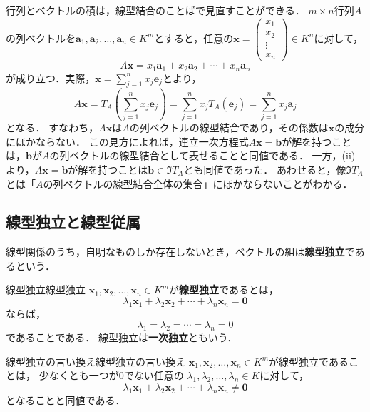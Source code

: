\begin{remark}[$A\bm{x}$は列ベクトルの線型結合]
  行列とベクトルの積は，線型結合のことばで見直すことができる．
  $m \times n$行列$A$の列ベクトルを$\bm{a}_1, \bm{a}_2, \dots, \bm{a}_n \in K^m$とすると，任意の$\bm{x} = \begin{pmatrix} x_1 \\ x_2 \\ \vdots \\ x_n \end{pmatrix} \in K^n$に対して，
  \[
    A\bm{x} = x_1 \bm{a}_1 + x_2 \bm{a}_2 + \cdots + x_n \bm{a}_n
  \]
  が成り立つ．実際，$\bm{x} = \sum_{j=1}^{n} x_j \bm{e}_j$とより，
  \[
    A\bm{x} = T_A\left(\sum_{j=1}^{n} x_j \bm{e}_j\right)
    = \sum_{j=1}^{n} x_j T_A(\bm{e}_j)
    = \sum_{j=1}^{n} x_j \bm{a}_j
  \]
  となる．
  すなわち，$A\bm{x}$は$A$の列ベクトルの線型結合であり，その係数は$\bm{x}$の成分にほかならない．
  この見方によれば，連立一次方程式$A\bm{x} = \bm{b}$が解を持つことは，$\bm{b}$が$A$の列ベクトルの線型結合として表せることと同値である．
  一方，(ii)より，$A\bm{x} = \bm{b}$が解を持つことは$\bm{b} \in \Im T_A$とも同値であった．
  あわせると，像$\Im T_A$とは「$A$の列ベクトルの線型結合全体の集合」にほかならないことがわかる．
\end{remark}

\subsection{線型独立と線型従属}

線型関係のうち，自明なものしか存在しないとき，ベクトルの組は\textbf{線型独立}であるという．

\begin{definition}{線型独立}{線型独立}
  $\bm{x}_1, \bm{x}_2, \dots, \bm{x}_n \in K^m$が\textbf{線型独立}であるとは，
  \[
    \lambda_1 \bm{x}_1 + \lambda_2 \bm{x}_2 + \cdots + \lambda_n \bm{x}_n = \bm{0}
  \]
  ならば，
  \[
    \lambda_1=\lambda_2=\cdots=\lambda_n = 0
  \]
  であることである．
  線型独立は\textbf{一次独立}ともいう．
\end{definition}

\begin{prop}{線型独立の言い換え}{線型独立の言い換え}
  $\bm{x}_1,\bm{x}_2,\dots,\bm{x}_n\in K^m$が線型独立であることは，
  少なくとも一つが$0$でない任意の
  $\lambda_1,\lambda_2,\dots,\lambda_n\in K$に対して，
  \[
    \lambda_1\bm{x}_1+\lambda_2\bm{x}_2+\cdots
    +\lambda_n\bm{x}_n\ne\bm{0}
  \]
  となることと同値である．
\end{prop}

